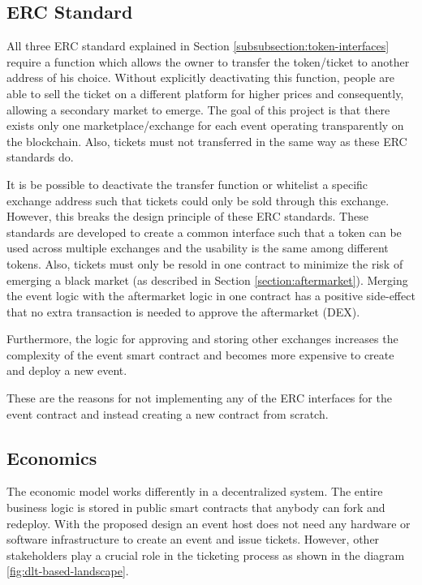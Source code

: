 \subsection{ERC Standard}
All three ERC standard explained in Section \ref{subsubsection:token-interfaces} require a function which allows the owner to transfer the token/ticket to another address of his choice. Without explicitly deactivating this function, people are able to sell the ticket on a different platform for higher prices and consequently, allowing a secondary market to emerge. The goal of this project is that there exists only one marketplace/exchange for each event operating transparently on the blockchain. Also, tickets must not transferred in the same way as these ERC standards do.

It is be possible to deactivate the transfer function or whitelist a specific exchange address such that tickets could only be sold through this exchange. However, this breaks the design principle of these ERC standards. These standards are developed to create a common interface such that a token can be used across multiple exchanges and the usability is the same among different tokens. Also, tickets must only be resold in one contract to minimize the risk of emerging a black market (as described in Section \ref{section:aftermarket}). Merging the event logic with the aftermarket logic in one contract has a positive side-effect that no extra transaction is needed to approve the aftermarket (DEX). 

Furthermore, the logic for approving and storing other exchanges increases the complexity of the event smart contract and becomes more expensive to create and deploy a new event.

These are the reasons for not implementing any of the ERC interfaces for the event contract and instead creating a new contract from scratch. 


\subsection{Economics}\label{design:economy}

The economic model works differently in a decentralized system. The entire business logic is stored in public smart contracts that anybody can fork and redeploy. With the proposed design an event host does not need any hardware or software infrastructure to create an event and issue tickets. However, other stakeholders play a crucial role in the ticketing process as shown in the diagram \ref{fig:dlt-based-landscape}.

